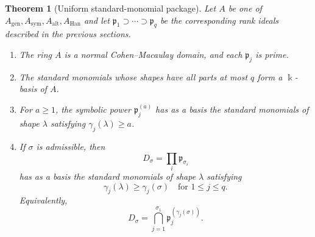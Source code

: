 \documentclass[11pt,reqno]{amsart}
\numberwithin{equation}{subsection}
\newtheorem{theorem}[equation]{Theorem}
\theoremstyle{definition}
\theoremstyle{remark}
\newcommand{\kfield}{\Bbbk}
\newcommand{\fp}{\mathfrak p}
\begin{document}
\begin{theorem}[Uniform standard-monomial package]\label{thm:package}
Let $A$ be one of
$A_{\mathrm{gen}},A_{\mathrm{sym}},A_{\mathrm{alt}},A_{\mathrm{Han}}$
and let $\fp_1\supset\cdots\supset\fp_q$ be the corresponding rank ideals described in the previous sections.
\begin{enumerate}[label=\textup{(\roman*)}]
 \item The ring $A$ is a normal Cohen--Macaulay domain, and each
 $\fp_j$ is prime.
 \item The standard monomials whose shapes have all parts at most $q$
 form a $\kfield$-basis of $A$.
 \item For $a\ge1$, the symbolic power $\fp_j^{(a)}$ has as a basis the
 standard monomials of shape $\lambda$ satisfying
 $\gamma_j(\lambda)\ge a$.
 \item If $\sigma$ is admissible, then
 \begin{equation}\label{eq:product-basis}
  D_\sigma=\prod_i\fp_{\sigma_i}
 \end{equation}
 has as a basis the standard monomials of shape $\lambda$ satisfying
 \begin{equation}\label{eq:all-gamma-ineq}
  \gamma_j(\lambda)\ge\gamma_j(\sigma)
  \quad\text{for }1\le j\le q.
 \end{equation}
 Equivalently,
 \begin{equation}\label{eq:uniform-primary}
  D_\sigma=\bigcap_{j=1}^{\sigma_1}
  \fp_j^{(\gamma_j(\sigma))}.
 \end{equation}
 \end{enumerate}
 \end{theorem}
\end{document}

